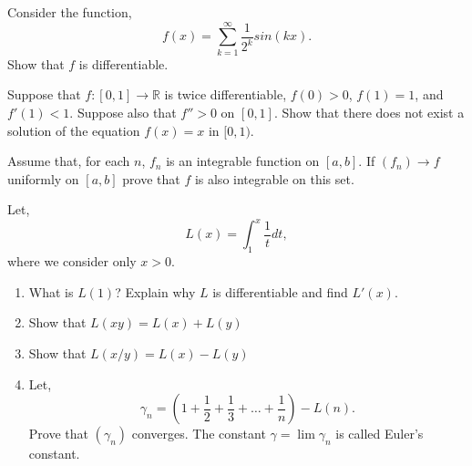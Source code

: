 \documentclass[12pt]{article}
\makeatletter
\theoremstyle{homework}
\newenvironment{exercise}[1]
{\def\@currentlabel{#1}\exercisecore}
{\endexercisecore}
\newcommand{\Reals}{\ensuremath{\mathbb R}}
\makeatother
\begin{document}
\begin{exercise}{9} Consider the function,
  \begin{equation*}
    f(x) = \sum_{k = 1}^{\infty} \dfrac{1}{2^k} sin(kx).
  \end{equation*}
  Show that $f$ is differentiable.
  
\end{exercise}
\vspace{.5in}




\begin{exercise}{10} Suppose that $f: [0,1] \to \Reals$ is twice differentiable, $f(0) > 0$, $f(1) = 1$, 
  and $f'(1) < 1$. Suppose also that $f'' > 0$ on $[0,1]$. Show that there does not exist a solution of the equation
  $f(x) = x$ in $[0,1)$.
  
\end{exercise}
\vspace{.5in}






\begin{exercise}{11} Assume that, for each $n$, $f_n$ is an integrable function on $[a,b].$
  If $(f_n) \to f$ uniformly on $[a,b]$ prove that $f$ is also integrable on this set. 
  
\end{exercise}
\vspace{.5in}

\begin{exercise}{12} Let,
  \begin{equation*}
    L(x) = \int_1^x \dfrac{1}{t} dt,
  \end{equation*}
  where we consider only $x > 0$.
  \begin{enumerate}
    \item What is $L(1)$? Explain why $L$ is differentiable and find $L'(x).$
    \item Show that $L(xy) = L(x)+L(y)$
    \item Show that $L(x/y) = L(x) - L(y)$
    \item Let,
    \begin{equation*}
      \gamma_n = (1 + \frac{1}{2} + \frac{1}{3}+ \dots+ \frac{1}{n}) - L(n).
    \end{equation*}
    Prove that $(\gamma_n)$ converges. The constant $\gamma = \lim \gamma_n$ is called Euler's constant.
  \end{enumerate}
\end{exercise}
\end{document}
